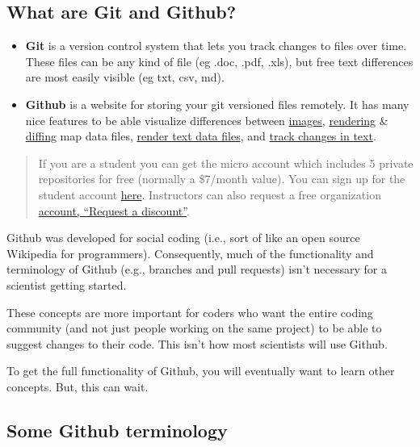 \documentclass[]{book}
\theoremstyle{definition}
\theoremstyle{definition}
\theoremstyle{definition}
\theoremstyle{remark}
\begin{document}
\subsection{What are Git and Github?}\label{what-are-git-and-github}

\begin{itemize}
\item
  \textbf{Git} is a version control system that lets you track changes
  to files over time. These files can be any kind of file (eg .doc,
  .pdf, .xls), but free text differences are most easily visible (eg
  txt, csv, md).
\item
  \textbf{Github} is a website for storing your git versioned files
  remotely. It has many nice features to be able visualize differences
  between
  \href{https://help.github.com/articles/rendering-and-diffing-images/}{images},
  \href{https://help.github.com/articles/mapping-geojson-files-on-github/}{rendering}
  \&
  \href{https://github.com/blog/1772-diffable-more-customizable-maps}{diffing}
  map data files,
  \href{https://help.github.com/articles/rendering-csv-and-tsv-data/}{render
  text data files}, and
  \href{https://help.github.com/articles/rendering-differences-in-prose-documents/}{track
  changes in text}.
\end{itemize}

\begin{quote}
If you are a student you can get the micro account which includes 5
private repositories for free (normally a \$7/month value). You can sign
up for the student account
\href{https://education.github.com/pack}{here}. Instructors can also
request a free organization
\href{https://education.github.com/}{account, ``Request a discount''}.
\end{quote}

Github was developed for social coding (i.e., sort of like an open
source Wikipedia for programmers). Consequently, much of the
functionality and terminology of Github (e.g., branches and pull
requests) isn't necessary for a scientist getting started.

These concepts are more important for coders who want the entire coding
community (and not just people working on the same project) to be able
to suggest changes to their code. This isn't how most scientists will
use Github.

To get the full functionality of Github, you will eventually want to
learn other concepts. But, this can wait.

\subsection{Some Github terminology}\label{some-github-terminology}
\end{document}
